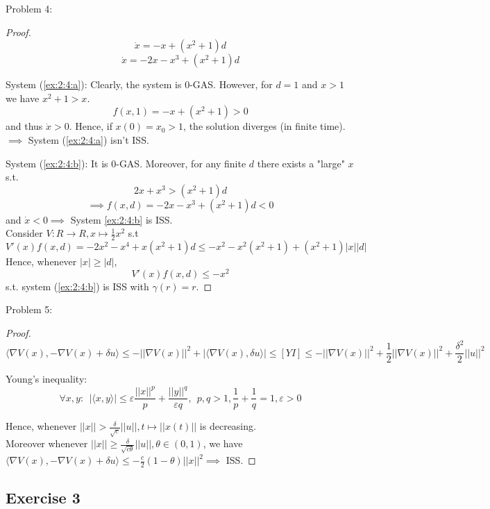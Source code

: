 Problem 4:
\begin{proof}
    \begin{equation} \label{ex:2:4:a}
        \dot x = -x + (x^2+1)d
    \end{equation}
        \begin{equation} \label{ex:2:4:b}
        \dot x = -2x -x^3 + (x^2+1)d
    \end{equation}
    
    System (\ref{ex:2:4:a}): Clearly, the system is 0-GAS. However, for $d=1$ and $x>1$ we have $x^2+1>x$.
    $$f(x,1) = -x+(x^2+1)>0$$
    and thus $\dot x>0$. Hence, if $x(0)=x_0>1$, the solution diverges (in finite time).\\
    $\implies$ System (\ref{ex:2:4:a}) isn't ISS.
    
    System (\ref{ex:2:4:b}): It is 0-GAS. Moreover, for any finite $d$ there exists a "large" $x$ s.t.
    $$2x+x^3>(x^2+1)d$$
    $$\implies f(x,d) = -2x-x^3+(x^2+1)d<0$$
    and $\dot x<0 \implies$ System \ref{ex:2:4:b} is ISS.\\
    Consider $V:R \rightarrow R, x \mapsto \frac{1}{2}x^2$ s.t
    $$V'(x)f(x,d)=-2x^2-x^4+x(x^2+1)d \le -x^2-x^2(x^2+1)+(x^2+1)|x||d|$$
    Hence, whenever $|x| \ge |d|$,
    $$V'(x)f(x,d) \le -x^2$$
    s.t. system (\ref{ex:2:4:b}) is ISS with $\gamma (r) = r$.
    \end{proof}
    
    Problem 5:
    \begin{proof}
        $$\langle \nabla V(x),-\nabla V(x)+\delta u\rangle \le -||\nabla V(x)||^2+|\langle \nabla V(x), \delta u \rangle| \le [YI] \le -||\nabla V(x)||^2+\frac{1}{2}||\nabla V(x)||^2+\frac{\delta^2}{2}||u||^2$$
        
        Young's inequality: \\
        $$\forall x,y: \ \ |\langle x,y \rangle| \le \varepsilon \frac{||x||^p}{p}+\frac{||y||^q}{\varepsilon q}, \ \ p,q>1, \frac{1}{p}+\frac{1}{q}=1, \varepsilon>0$$
        
        Hence, whenever $||x||>\frac{\delta}{\sqrt{c}}||u||, t \mapsto ||x(t)||$ is decreasing. \\
        Moreover whenever $||x|| \ge \frac{\delta}{\sqrt{c\theta}}||u||, \theta \in (0,1)$, we have $\langle \nabla V(x),-\nabla V(x)+\delta u\rangle \le -\frac{c}{2}(1-\theta)||x||^2 \implies$ ISS. 
    \end{proof}

\subsection{Exercise 3}

